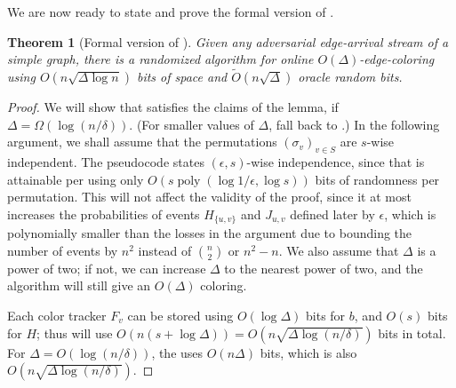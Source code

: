 \documentclass[10pt]{article}
\newtheorem{theorem}{Theorem}[section]
\theoremstyle{definition}\newtheorem{definition}[lemma]{Definition}
\theoremstyle{remark}  \newtheorem*{remark}{Remark}
\newcommand{\tO}{\widetilde{O}}
\DeclareMathOperator{\poly}{poly}
\begin{document}
We are now ready to state and prove the formal version of .

\begin{theorem}[Formal version of ]\label{thm:online-rand-ea-formal}
Given any adversarial edge-arrival stream of a simple graph, there is a randomized algorithm for online $O(\Delta)$-edge-coloring using $O(n \sqrt{\Delta \log n})$ bits of space
and $\tO(n \sqrt{\Delta})$ oracle random bits.
\end{theorem}



\begin{proof} We will show that  satisfies the claims of the lemma, if $\Delta = \Omega(\log (n/\delta))$. (For smaller values of $\Delta$, fall back to .) In the following argument, we shall assume that the permutations $(\sigma_v)_{v\in S}$ are $s$-wise independent. The pseudocode states $(\epsilon,s)$-wise independence, since that is attainable per  using only $O(s \poly(\log 1/\epsilon, \log s))$ bits of randomness per permutation. This will not affect the validity of the proof, since it at most increases the probabilities of events $H_{\{u,v\}}$ and $J_{u,v}$ defined later by $\epsilon$, which is polynomially smaller than the losses in the argument due to bounding the number of events by $n^2$ instead of $\binom{n}{2}$ or $n^2 - n$. We also assume that $\Delta$ is a power of two; if not, we can increase $\Delta$ to the nearest power of two, and the algorithm will still give an $O(\Delta)$ coloring.

  Each color tracker $F_v$ can be stored using $O(\log \Delta)$ bits for $b$, and $O(s)$ bits for $H$; thus 
    will use $O(n (s + \log \Delta)) = O(n \sqrt{\Delta \log (n/\delta)})$ bits in total.
  For $\Delta = O(\log (n/\delta))$, the  uses $O(n \Delta)$ bits, which is also $O(n \sqrt{\Delta \log (n/\delta)})$.
  

\end{proof}
\end{document}
